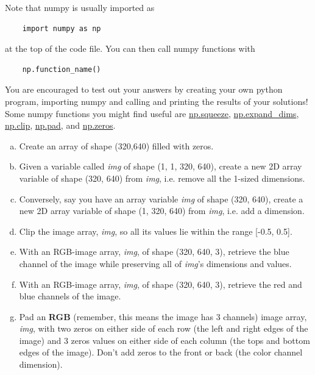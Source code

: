Note that numpy is usually imported as
\begin{verbatim}
    import numpy as np
\end{verbatim}
at the top of the code file. You can then call numpy functions with \begin{verbatim}
    np.function_name()
\end{verbatim}
You are encouraged to test out your answers by creating your own python program, importing numpy and calling and printing the results of your solutions! Some numpy functions you might find useful are \href{https://numpy.org/doc/stable/reference/generated/numpy.squeeze.html}{np.squeeze}, \href{https://numpy.org/doc/stable/reference/generated/numpy.expand_dims.html}{np.expand\_dims}, \href{https://numpy.org/doc/stable/reference/generated/numpy.clip.html}{np.clip}, \href{https://numpy.org/doc/stable/reference/generated/numpy.pad.html}{np.pad}, and \href{https://numpy.org/doc/stable/reference/generated/numpy.zeros.html}{np.zeros}.

\begin{enumerate}[a.]
    \item Create an array of shape (320,640) filled with zeros.
    \item Given a variable called \emph{img} of shape (1, 1, 320, 640), create a new 2D array variable of shape (320, 640) from \emph{img}, i.e. remove all the 1-sized dimensions.
    \item Conversely, say you have an array variable \emph{img} of shape (320, 640), create a new 2D array variable of shape (1, 320, 640) from \emph{img}, i.e. add a dimension.
    \item Clip the image array, \emph{img}, so all its values lie within the range [-0.5, 0.5].
    \item With an RGB-image array, \emph{img}, of shape (320, 640, 3), retrieve the blue channel of the image while preserving all of \emph{img}'s dimensions and values.
    \item With an RGB-image array, \emph{img}, of shape (320, 640, 3), retrieve the red and blue channels of the image.
    \item Pad an \textbf{RGB} (remember, this means the image has 3 channels) image array, \emph{img}, with two zeros on either side of each row (the left and right edges of the image) and 3 zeros values on either side of each column (the tops and bottom edges of the image). Don't add zeros to the front or back (the color channel dimension).
\end{enumerate}


